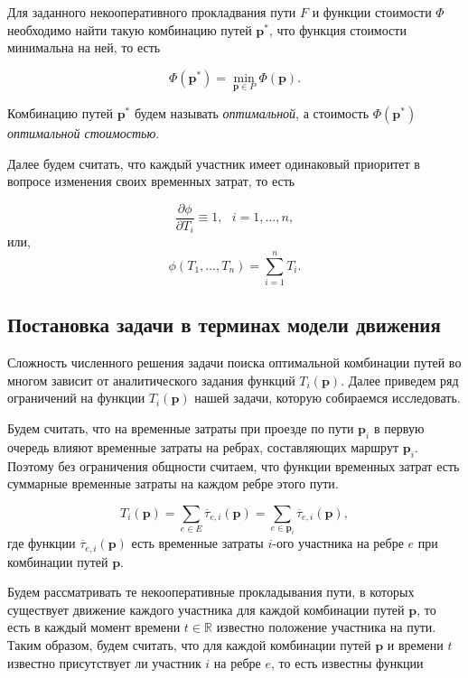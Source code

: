 \documentclass[12pt, a4paper]{article}
\DeclareMathOperator*{\minn}{min}
\begin{document}
Для заданного некооперативного прокладвания пути $F$ и функции стоимости $\Phi$ необходимо найти такую комбинацию путей $\textbf{p}^*$, что функция стоимости минимальна на ней, то есть

\begin{equation}
	\label{eq:target_global_task_T} 
	\Phi (\textbf{p}^*) = \minn\limits_{ \textbf{p} \in P} \Phi (\textbf{p}).
\end{equation}

Комбинацию путей $\textbf{p}^*$ будем называть \textit {оптимальной}, а стоимость  $ \Phi (\textbf{p}^*)$ \textit {оптимальной стоимостью}.

Далее будем считать, что каждый участник имеет одинаковый приоритет в вопросе изменения своих временных затрат, то есть 

\begin{equation*}
	\frac{\partial \phi}{\partial T_i} \equiv 1, \text{ } i = 1, \ldots, n,
\end{equation*}
или, 
\begin{equation*}
\phi(T_1, \ldots, T_n) = \sum\limits_{i = 1}^nT_i.
\end{equation*}

\subsection{Постановка задачи в терминах модели движения}

Сложность численного решения задачи поиска оптимальной комбинации путей во многом зависит от аналитического задания функций $T_i (\textbf{p})$. Далее приведем ряд ограничений на функции $T_i (\textbf{p})$ нашей задачи, которую собираемся исследовать.

Будем считать, что на временные затраты при проезде по пути $\textbf{p}_i$ в первую очередь влияют временные затраты на ребрах, составляющих маршрут $\textbf{p}_i$. Поэтому без ограничения общности считаем, что функции временных затрат есть суммарные временные затраты на каждом ребре этого пути.

$$T_i (\textbf{p}) = \sum \limits_{e \in E} \overline{\tau}_{e, i} (\textbf{p}) = \sum \limits_{e \in \textbf{p}_i} \overline{\tau}_{e, i} (\textbf{p}), $$
где функции $\overline{\tau}_{e, i} (\textbf{p})$ есть временные затраты $i$-ого участника на ребре $e$ при комбинации путей $\textbf{p}$. 

Будем рассматривать те некооперативные прокладывания пути, в которых существует движение каждого участника для каждой комбинации путей $\textbf{p}$, то есть в каждый момент времени $t \in \mathbb{R}$ известно положение участника на пути. Таким образом, будем считать, что для каждой комбинации путей $\textbf{p}$ и времени $t$ известно присутствует ли участник $i$ на ребре $e$, то есть известны функции
\end{document}
